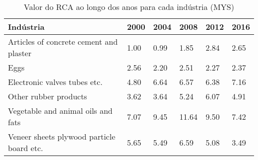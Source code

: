 \begin{table}
\centering
\caption{Valor do RCA ao longo dos anos para cada indústria (MYS)}
\begin{tabular}{p{6cm}p{1.5cm}p{1.5cm}p{1.5cm}p{1.5cm}p{1.5cm}}
\toprule
                                Indústria & 2000 & 2004 &  2008 & 2012 & 2016 \\
\midrule
  Articles of concrete cement and plaster & 1.00 & 0.99 &  1.85 & 2.84 & 2.65 \\
                                     Eggs & 2.56 & 2.20 &  2.51 & 2.27 & 2.37 \\
             Electronic valves tubes etc. & 4.80 & 6.64 &  6.57 & 6.38 & 7.16 \\
                    Other rubber products & 3.62 & 3.64 &  5.24 & 6.07 & 4.91 \\
       Vegetable and animal oils and fats & 7.07 & 9.45 & 11.64 & 9.50 & 7.42 \\
Veneer sheets plywood particle board etc. & 5.65 & 5.49 &  6.59 & 5.08 & 3.49 \\
\bottomrule
\end{tabular}
\end{table}
